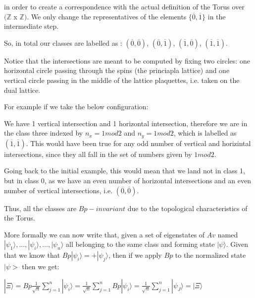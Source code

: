 \documentclass[12pt]{report}
\begin{document}
\begin{minipage}{1 \textwidth}
	
	in order to create a correspondence with the actual definition of the Torus over $(\mathbb{Z}$ x $\mathbb{Z})$. 
	We only change the representatives of the elements $\{\overline{0},\overline{1} \}$ in the intermediate step. \newline
	
	So, in total our classes are labelled as : $(\overline{0},\overline{0} )$, $(\overline{0},\overline{1} )$, $(\overline{1},\overline{0})$, $(\overline{1},\overline{1})$.\newline
	
	Notice that the intersections are meant to be computed by fixing two circles: one horizontal circle passing through the spins (the princiapla lattice) and one vertical circle passing in the middle of the lattice plaquettes, i.e. taken on the dual lattice.\newline
	
	For example if we take the below configuration: \newline
	
	
	We have 1 vertical intersection and 1 horizontal intersection, therefore we are in the class three indexed by $n_x=1mod2$ and $n_y=1mod2$, which is labelled as $(\overline{1},\overline{1})$. This would have been true for any odd number of vertical and horizintal intersections, since they all fall in the set of numbers given by $1mod2$.\newline
	
	Going back to the initial example, this would mean that we land not in class 1, but in class 0, as we have an even number of horizontal intersections and an even number of vertical intersections, i.e.   $(\overline{0}, \overline{0})$.\newline
	
	Thus, all the classes are $Bp-invariant$ due to the topological characteristics of the Torus.\newline
	
	More formally we can now write that, given a set of eigenstates of $Av$ named $|\psi_1\rangle,...,|\psi_i\rangle,...,|\psi_n\rangle$ all belonging to the same class and forming state $|\psi\rangle$. Given that we know that $Bp|\psi_i\rangle=+|\psi_j\rangle$, then if we apply $Bp$ to the normalized state $|\psi>$ then we get:
	
	\begin{center}
		$|\Xi\rangle= Bp \frac{1}{\sqrt{n}} \sum_{j=1}^{n} |\psi_i\rangle = \frac{1}{\sqrt{n}} \sum_{j=1}^{n} Bp |\psi_i\rangle = \frac{1}{\sqrt{n}} \sum_{j=1}^{n} |\psi_J\rangle =|\Xi\rangle$
	\end{center}
	

\end{minipage}
\end{document}
